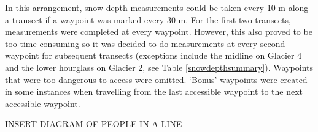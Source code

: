 \documentclass[12pt]{article}
\begin{document}
In this arrangement, snow depth measurements could be taken every 10 m along a transect if a waypoint was marked every 30 m. For the first two transects, measurements were completed at every waypoint. However, this also proved to be too time consuming so it was decided to do measurements at every second waypoint for subsequent transects (exceptions include the midline on Glacier 4 and the lower hourglass on Glacier 2, see Table \ref{snowdepthsummary}). Waypoints that were too dangerous to access were omitted. `Bonus' waypoints were created in some instances when travelling from the last accessible waypoint to the next accessible waypoint.


INSERT DIAGRAM OF PEOPLE IN A LINE

\end{document}
